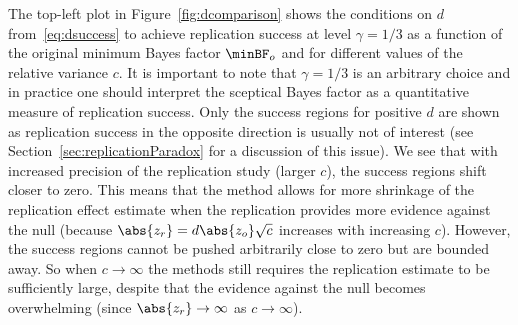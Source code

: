 The top-left plot in Figure~\ref{fig:dcomparison} shows the conditions on $d$
from~\eqref{eq:dsuccess} to achieve replication success at level $\gamma = 1/3$
as a function of the original minimum Bayes factor $\minBF_{o}$ and for
different values of the relative variance $c$. It is important to note that
$\gamma = 1/3$ is an arbitrary choice and in practice one should interpret the
sceptical Bayes factor as a quantitative measure of replication success. Only
the success regions for positive $d$ are shown as replication success in the
opposite direction is usually not of interest (see
Section~\ref{sec:replicationParadox} for a discussion of this issue). We see
that with increased precision of the replication study (larger $c$), the success
regions shift closer to zero. This means that the method allows for more
shrinkage of the replication effect estimate when the replication provides more
evidence against the null (because $\abs{z_{r}} = d \abs{z_{o}} \sqrt{c}$
increases with increasing $c$). However, the success regions cannot be pushed
arbitrarily close to zero but are bounded away. So when $c \to \infty$ the
methods still requires the replication estimate to be sufficiently large,
despite that the evidence against the null becomes overwhelming (since
$\abs{z_{r}} \to \infty$ as $c \to \infty$).


